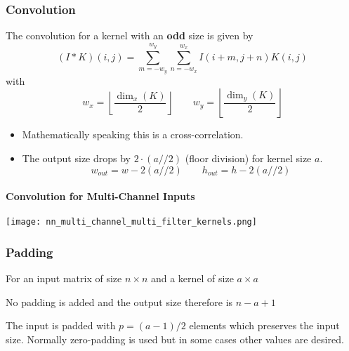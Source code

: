 \subsubsection{Convolution}
The convolution for a kernel with an \textbf{odd} size is given by
\begin{equation*}
    (I * K)(i,j) = \sum_{m=-w_y}^{w_y}\sum_{n=-w_x}^{w_x}I(i+m,j+n)K(i,j)
\end{equation*}
with
\begin{equation*}
    w_x = \left\lfloor \frac{\dim_x(K)}{2} \right\rfloor \qquad
    w_y = \left\lfloor \frac{\dim_y(K)}{2} \right\rfloor
\end{equation*}

\newpar{}
\begin{itemize}
    \item Mathematically speaking this is a cross-correlation.
    \item The output size drops by $2\cdot (a//2)$ (floor division) for kernel size $a$.
          \begin{equation*}
              w_{out}=  w-2(a//2) \qquad
              h_{out}=  h-2(a//2)
          \end{equation*}
\end{itemize}

\paragraph{Convolution for Multi-Channel Inputs}
\begin{center}
    \texttt{[image: nn\_multi\_channel\_multi\_filter\_kernels.png]}
\end{center}

\subsubsection{Padding}

For an input matrix of size $n\times n$ and a kernel of size $a\times a$

\newpar{}

No padding is added and the output size therefore is $n-a+1$

\newpar{}

The input is padded with $p=(a-1)/2$ elements which preserves the input size. Normally zero-padding is used but in some cases other values are desired.


